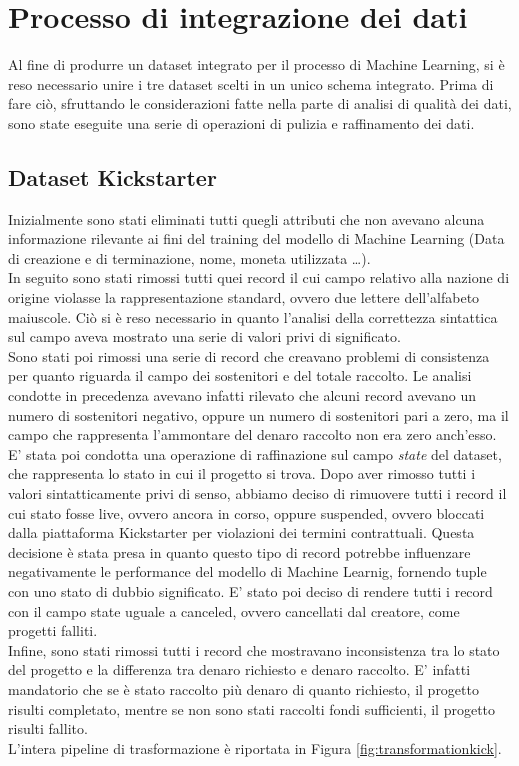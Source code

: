 \section{Processo di integrazione dei dati}
Al fine di produrre un dataset integrato per il processo di Machine Learning, si è reso necessario unire i tre dataset scelti in un unico schema integrato. Prima di fare ciò, sfruttando le considerazioni fatte nella parte di analisi di qualità dei dati, sono state eseguite una serie di operazioni di pulizia e raffinamento dei dati.\\
\subsection{Dataset Kickstarter}
Inizialmente sono stati eliminati tutti quegli attributi che non avevano alcuna informazione rilevante ai fini del training del modello di Machine Learning (Data di creazione e di terminazione, nome, moneta utilizzata \dots).\\
In seguito sono stati rimossi tutti quei record il cui campo relativo alla nazione di origine violasse la rappresentazione standard, ovvero due lettere dell'alfabeto maiuscole. Ciò si è reso necessario in quanto l'analisi della correttezza sintattica sul campo aveva mostrato una serie di valori privi di significato.\\
Sono stati poi rimossi una serie di record che creavano problemi di consistenza per quanto riguarda il campo dei sostenitori e del totale raccolto. Le analisi condotte in precedenza avevano infatti rilevato che alcuni record avevano un numero di sostenitori negativo, oppure un numero di sostenitori pari a zero, ma il campo che rappresenta l'ammontare del denaro raccolto non era zero anch'esso.\\
E' stata poi condotta una operazione di raffinazione sul campo \textit{state} del dataset, che rappresenta lo stato in cui il progetto si trova. Dopo aver rimosso tutti i valori sintatticamente privi di senso, abbiamo deciso di rimuovere tutti i record il cui stato fosse live, ovvero ancora in corso, oppure suspended, ovvero bloccati dalla piattaforma Kickstarter per violazioni dei termini contrattuali. Questa decisione è stata presa in quanto questo tipo di record potrebbe influenzare negativamente le performance del modello di Machine Learnig, fornendo tuple con uno stato di dubbio significato.
E' stato poi deciso di rendere tutti i record con il campo state uguale a canceled, ovvero cancellati dal creatore, come progetti falliti.\\
Infine, sono stati rimossi tutti i record che mostravano inconsistenza tra lo stato del progetto e la differenza tra denaro richiesto e denaro raccolto. E' infatti mandatorio che se è stato raccolto più denaro di quanto richiesto, il progetto risulti completato, mentre se non sono stati raccolti fondi sufficienti, il progetto risulti fallito.\\
L'intera pipeline di trasformazione è riportata in Figura \ref{fig:transformationkick}.

